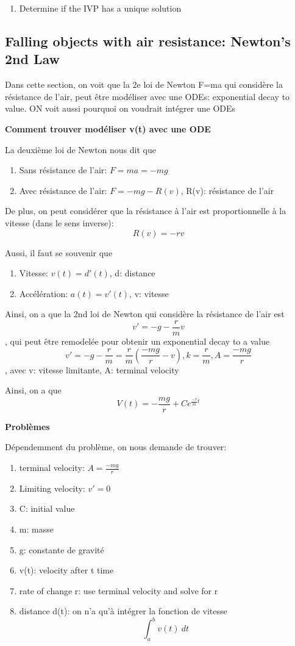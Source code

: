 \documentclass{article}
\begin{document}
\begin{problem}
    \begin{enumerate}
        \item Determine if the IVP has a unique solution
    \end{enumerate}
\end{problem}


\subsection{Falling objects with air resistance: Newton's 2nd Law}

Dans cette section, on voit que la 2e loi de Newton F=ma qui considère
la résistance de l'air, peut être modéliser avec une ODEs: exponential
decay to value. ON voit aussi pourquoi on voudrait intégrer une ODEs

\textbf{Comment trouver modéliser v(t) avec une ODE}

La deuxième loi de Newton nous dit que
\begin{enumerate}
    \item Sans résistance de l'air: $ F=ma=-mg $
    \item Avec résistance de l'air: $ F=-mg - R(v) $, R(v): résistance
	de l'air
\end{enumerate}

De plus, on peut considérer que la résistance à l'air est proportionnelle
à la vitesse (dans le sens inverse): $$ R(v) = -rv $$

Aussi, il faut se souvenir que
\begin{enumerate}
    \item Vitesse: $ v(t) = d'(t) $, d: distance
    \item Accélération: $ a(t) = v'(t) $, v: vitesse
\end{enumerate}

Ainsi, on a que la 2nd loi de Newton qui considère la résistance de l'air
est $$ v' = -g - \frac{r}{m} v $$, qui peut être remodelée pour obtenir
un exponential decay to a value
$$ v' = -g - \frac{r}{m} = \frac{r}{m} (\frac{-mg}{r} - v),
k = \frac{r}{m}, A = \frac{-mg}{r}$$, avec v: vitesse limitante,
A: terminal velocity

Ainsi, on a que $$ V(t) = -\frac{mg}{r} + C e^{\frac{-r}{m} t} $$

\textbf{Problèmes}

Dépendemment du problème, on nous demande de trouver:
\begin{enumerate}
    \item terminal velocity: $ A = \frac{-mg}{r} $
    \item Limiting velocity: $ v' = 0 $
    \item C: initial value
    \item m: masse
    \item g: constante de gravité
    \item v(t): velocity after t time
    \item rate of change r: use terminal velocity and solve for r
    \item distance d(t): on n'a qu'à intégrer la fonction de vitesse
	$$ \int_{{a}}^{{b}} {v(t)} \: d{t} $$
\end{enumerate}
\end{document}
